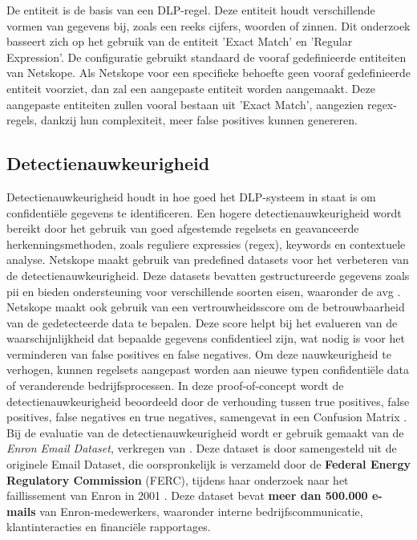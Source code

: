 De entiteit is de basis van een DLP-regel. 
Deze entiteit houdt verschillende vormen van gegevens bij, zoals een reeks cijfers, woorden of zinnen. 
Dit onderzoek basseert zich op het gebruik van de entiteit 'Exact Match' en 'Regular Expression'. 
De configuratie gebruikt standaard de vooraf gedefinieerde entiteiten van Netskope. 
Als Netskope voor een specifieke behoefte geen vooraf gedefinieerde entiteit voorziet, dan zal een aangepaste entiteit worden aangemaakt.
Deze aangepaste entiteiten zullen vooral bestaan uit 'Exact Match', aangezien regex-regels, dankzij hun complexiteit, meer false positives kunnen genereren.


\subsection{Detectienauwkeurigheid}
\label{sec:detectienauwkeurigheid-literatuurstudie}

Detectienauwkeurigheid houdt in hoe goed het DLP-systeem in staat is om confidentiële gegevens te identificeren. 
Een hogere detectienauwkeurigheid wordt bereikt door het gebruik van goed afgestemde regelsets en geavanceerde herkenningsmethoden, zoals reguliere expressies (regex), keywords en contextuele analyse.
Netskope maakt gebruik van predefined datasets voor het verbeteren van de detectienauwkeurigheid. 
Deze datasets bevatten gestructureerde gegevens zoals \gls{pii} en bieden ondersteuning voor verschillende soorten eisen, waaronder de \gls{avg} \autocite{Clementelli2023}. 
Netskope maakt ook gebruik van een vertrouwheidsscore om de betrouwbaarheid van de gedetecteerde data te bepalen. 
Deze score helpt bij het evalueren van de waarschijnlijkheid dat bepaalde gegevens confidentieel zijn, 
wat nodig is voor het verminderen van false positives en false negatives. 
Om deze nauwkeurigheid te verhogen, kunnen regelsets aangepast worden aan nieuwe typen confidentiële data of veranderende bedrijfsprocessen.
In deze proof-of-concept wordt de detectienauwkeurigheid beoordeeld door de verhouding tussen true positives, false positives, 
false negatives en true negatives, samengevat in een Confusion Matrix \autocite{Microsoftn.d.}.
Bij de evaluatie van de detectienauwkeurigheid wordt er gebruik gemaakt van de \textit{Enron Email Dataset}, verkregen van \textcite{Cukierski2015Enron}.
Deze dataset is door \textcite{Cukierski2015Enron} samengesteld uit de originele \textcite{Enron2015} Email Dataset, die oorspronkelijk is verzameld door de \textbf{Federal Energy Regulatory Commission} (FERC), 
tijdens haar onderzoek naar het faillissement van Enron in 2001 \autocite{Wade2003, Healy2003}.
Deze dataset bevat \textbf{meer dan 500.000 e-mails} van Enron-medewerkers, waaronder interne bedrijfscommunicatie, klantinteracties en financiële rapportages.



